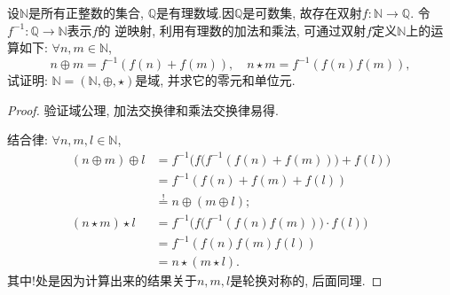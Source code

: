 \begin{problem}\label{ex:1.1.4}
    设$\mathbb{N}$是所有正整数的集合, $\mathbb{Q}$是有理数域.因$\mathbb{Q}$是可数集, 
故存在双射$f:\mathbb{N} \to \mathbb{Q}$. 令$f^{-1}:\mathbb{Q} \to \mathbb{N}$表示$f$的
逆映射, 利用有理数的加法和乘法, 可通过双射$f$定义$\mathbb{N}$上的运算如下: 
$\forall n, m \in \mathbb{N}$, 
\[
    n \oplus m = f^{-1}(f(n) + f(m)), \quad n \star m = f^{-1}(f(n)f(m)),
\]
试证明: $\mathbb{N} = (\mathbb{N}, \oplus, \star)$是域, 并求它的零元和单位元.
\end{problem}

\begin{proof}
    验证域公理, 加法交换律和乘法交换律易得.

    结合律: $\forall n, m, l \in \mathbb{N}$,
\[
\begin{aligned}
    (n \oplus m) \oplus l &= f^{-1}\biggl(f\bigl(f^{-1}(f(n) + f(m))\bigr)+ f(l)\biggr)\\
    &= f^{-1}(f(n) + f(m) + f(l)) \\
    &\overset{!}= n \oplus (m \oplus l);\\
    (n \star m) \star l &= f^{-1}\biggl(f\bigl(f^{-1}(f(n)f(m))\bigr) \cdot f(l)\biggr)\\
    &= f^{-1}(f(n)f(m)f(l)) \\
    &= n \star (m \star l).
\end{aligned}
\]
其中!处是因为计算出来的结果关于$n, m, l$是轮换对称的, 后面同理.


\end{proof}
